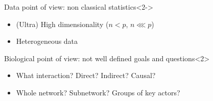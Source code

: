 \begin{frame}
  \vspace{-.25cm}
  \begin{block}{Data point of view: \alert{non classical statistics}}<2->
    \vspace{-.25cm}
    \begin{footnotesize}
    \begin{itemize}
    \item (Ultra) High dimensionality ($n<p$, $n\lll p$)
    \item Heterogeneous data
    \end{itemize}
      \end{footnotesize}    
  \end{block}
  \vspace{-.35cm}
  \begin{block}{Biological point of view: \alert{not well defined goals and questions}}<2>
    \vspace{-.25cm}    
    \begin{footnotesize}
    \begin{itemize}
    \item What interaction? Direct? Indirect? Causal?
    \item Whole network? Subnetwork? Groups of key actors?
    \end{itemize}
      \end{footnotesize}    
  \end{block}

\end{frame}

